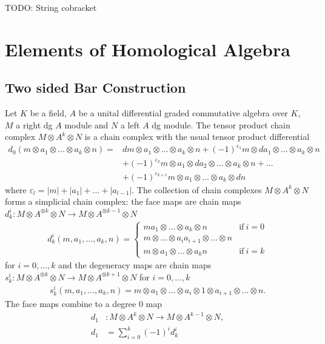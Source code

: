 \documentclass{scrartcl}
\theoremstyle{plain}
\theoremstyle{definition}
\renewcommand{\epsilon}{\varepsilon}
\newcommand{\abs}[1]{\left\lvert#1\right\rvert}
\begin{document}
TODO: String cobracket


\section{Elements of Homological Algebra}

\subsection{Two sided Bar Construction}\label{subseq:bar_construction}
Let $K$ be a field, $A$ be a unital differential graded commutative algebra over $K$, $M$ a right dg $A$ module and $N$ a left $A$ dg module. The tensor product chain complex $M\otimes A^{k}\otimes N$ is a chain complex with the usual tensor product differential 
\begin{align*}
    d_0(m\otimes a_1\otimes \dots\otimes  a_k\otimes  n) = &dm\otimes a_1\otimes \dots\otimes a_k\otimes n+(-1)^{\epsilon_1}m\otimes da_1\otimes \dots\otimes a_k\otimes n\\&+(-1)^{\epsilon_2}m\otimes a_1\otimes da_2\otimes \dots\otimes a_k\otimes n + \dots \\&+ (-1)^{\epsilon_{k+1}}m\otimes a_1\otimes \dots\otimes a_k\otimes dn
\end{align*}
where $\epsilon_l = \abs{m}+\abs{a_1}+\dots+\abs{a_{l-1}}$. The collection of chain complexes $M\otimes A^k\otimes N$ forms a simplicial chain complex: the face maps are chain maps $d^i_k\colon M\otimes A^{\otimes k}\otimes N\to M\otimes A^{\otimes {k-1}}\otimes N$ 
\begin{align*}
    d^i_k(m, a_1, \dots, a_k, n) = \begin{cases}ma_1\otimes\dots\otimes a_k\otimes n & \text{if}\ i=0\\
    m\otimes \dots\otimes a_ia_{i+1}\otimes \dots\otimes n\\
    m\otimes a_1\otimes\dots\otimes a_k n & \text{if}\ i=k
\end{cases}
\end{align*}
for $i=0,\dots, k$ and the degeneracy maps are chain maps $s^i_k\colon M\otimes A^{\otimes k}\otimes N\to M\otimes A^{\otimes {k+1}}\otimes N$ for $i=0, \dots, k$
\begin{align*}
    s^i_k(m, a_1,\dots, a_k, n) = m\otimes a_1\otimes\dots\otimes a_i\otimes 1\otimes a_{i+1}\otimes\dots\otimes n.
\end{align*}
The face maps combine to a degree $0$ map
\begin{align*}
    d_1&\colon M\otimes A^{k}\otimes N\to M\otimes A^{k-1}\otimes N, \\
    d_1& = \sum_{i=0}^k (-1)^i d_k^i
\end{align*} 
\end{document}

